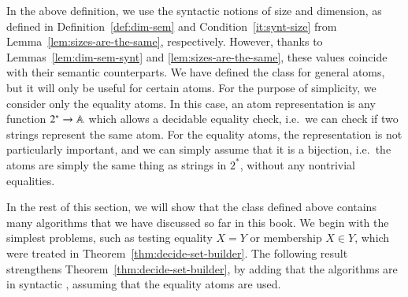 In the above definition, we use the syntactic notions of size and dimension, as defined in Definition~\ref{def:dim-sem} and Condition~\ref{it:synt-size} from Lemma~\ref{lem:sizes-are-the-same}, respectively.  However, thanks to Lemmas~\ref{lem:dim-sem-synt} and \ref{lem:sizes-are-the-same}, these values coincide with their semantic counterparts. 
We have defined the class for general atoms, but  it will only be useful for certain atoms. For the purpose of simplicity, we consider only the equality atoms. In this case, an atom representation is any function $2^* \to \mathbb A$ which allows a decidable equality check, i.e.~we can check if two strings represent the same atom. For the equality atoms, the representation is not particularly important, and we can simply assume that it is a bijection, i.e.~the atoms are simply the same thing as strings in $2^*$, without any nontrivial equalities.

In the rest of this section, we will show that the  class defined above contains many algorithms that we have discussed so far in this book. We begin with the simplest problems, such as testing equality $X=Y$ or membership $X \in Y$, which were treated in  Theorem~\ref{thm:decide-set-builder}. The following result strengthens Theorem~\ref{thm:decide-set-builder}, by adding that the algorithms are in syntactic \fdp, assuming that the equality atoms are used.

